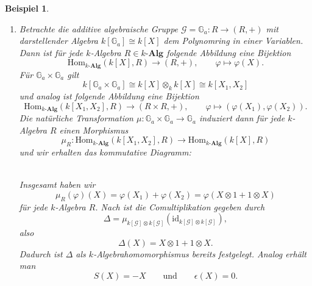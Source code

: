 \documentclass[a4paper, 11pt]{scrartcl}
\newcommand{\Hom}{\text{Hom}}
\newcommand{\id}{\text{id}}
\theoremstyle{basicstyle}
\newtheorem{beispiel}[definition]{Beispiel}
\begin{document}
    \begin{beispiel}
        \begin{enumerate}
            \item Betrachte die additive algebraische Gruppe \(\mathcal{G} = \mathbb{G}_a : R \longrightarrow (R, +)\) mit darstellender Algebra \(k[\mathbb{G}_a] \cong k[X]\) dem Polynomring in einer Variablen.
                Dann ist für jede \(k\)-Algebra \(R \in k\textbf{-Alg}\) folgende Abbildung eine Bijektion
                \[\Hom_{k\textbf{-Alg}}(k[X], R) \longrightarrow (R, +), \qquad \varphi \mapsto \varphi(X).\]
                Für \(\mathbb{G}_a \times \mathbb{G}_a\) gilt
                \[k[\mathbb{G}_a \times \mathbb{G}_a] \cong k[X] \otimes_k k[X] \cong k[X_1, X_2]\]
                und analog ist folgende Abbildung eine Bijektion
                \[\Hom_{k\textbf{-Alg}}(k[X_1, X_2], R) \longrightarrow (R \times R, +), \qquad \varphi \mapsto (\varphi(X_1), \varphi(X_2)).\]
                Die natürliche Transformation \(\mu: \mathbb{G}_a \times \mathbb{G}_a \to \mathbb{G}_a\) induziert dann für jede \(k\)-Algebra \(R\) einen Morphismus
                \[\mu_R : \Hom_{k\textbf{-Alg}}(k[X_1, X_2], R) \longrightarrow \Hom_{k\textbf{-Alg}}(k[X], R)\]
                und wir erhalten das kommutative Diagramm: 
                \begin{figure*}[ht!]
                    \centering
                \end{figure*} \\
                Insgesamt haben wir \[\mu_R(\varphi)(X) = \varphi(X_1) + \varphi(X_2) = \varphi(X \otimes 1 + 1 \otimes X)\]
                für jede \(k\)-Algebra \(R\).
                Nach  ist die Comultiplikation gegeben durch
                \[\Delta = \mu_{k[\mathcal{G}] \otimes k[\mathcal{G}]}(\id_{k[\mathcal{G}] \otimes k[\mathcal{G}]}),\]
                also \[\Delta(X) = X \otimes 1 + 1 \otimes X.\]
                Dadurch ist \(\Delta\) als \(k\)-Algebrahomomorphismus bereits festgelegt.
                Analog erhält man \[S(X) = -X \qquad\text{und}\qquad \epsilon(X) = 0.\]


\end{enumerate}
\end{beispiel}
\end{document}
